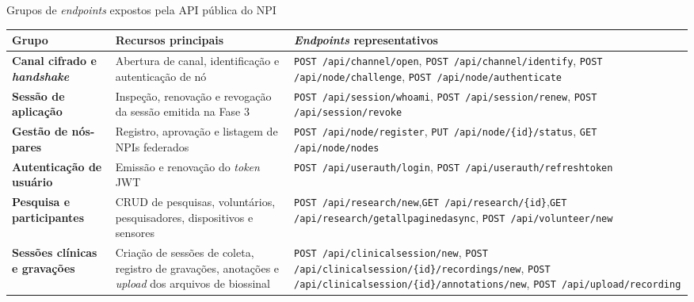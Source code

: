 \begin{tabframed}[htpb]
\caption{Grupos de \textit{endpoints} expostos pela API pública do NPI}
\label{quad:NPIEndpoints}
\begin{tabular}{|p{}|p{}|p{}|}
\hline
\textbf{Grupo} & \textbf{Recursos principais} & \textbf{\textit{Endpoints} representativos} \\ \hline
\textbf{Canal cifrado e \textit{handshake}} & Abertura de canal, identificação e autenticação de nó & \texttt{POST /api/channel/open}, \newline \texttt{POST /api/channel/identify}, \newline \texttt{POST /api/node/challenge}, \newline \texttt{POST /api/node/authenticate} \\ \hline
\textbf{Sessão de aplicação} & Inspeção, renovação e revogação da sessão emitida na Fase 3 & \texttt{POST /api/session/whoami}, \newline\texttt{POST /api/session/renew}, \newline\texttt{POST /api/session/revoke} \\ \hline
\textbf{Gestão de nós-pares} & Registro, aprovação e listagem de NPIs federados & \texttt{POST /api/node/register}, \newline \texttt{PUT /api/node/\{id\}/status}, \newline\texttt{GET /api/node/nodes} \\ \hline
\textbf{Autenticação de usuário} & Emissão e renovação do \textit{token} JWT & \texttt{POST /api/userauth/login}, \newline\texttt{POST /api/userauth/refreshtoken} \\ \hline
\textbf{Pesquisa e participantes} & CRUD de pesquisas, voluntários, pesquisadores, dispositivos e sensores & \texttt{POST /api/research/new},\newline\texttt{GET /api/research/\{id\}},\newline\texttt{GET /api/research/getallpaginedasync}, \texttt{POST /api/volunteer/new} \\ \hline
\textbf{Sessões clínicas e gravações} & Criação de sessões de coleta, registro de gravações, anotações e \textit{upload} dos arquivos de biossinal & \texttt{POST /api/clinicalsession/new}, \newline\texttt{POST /api/clinicalsession/\{id\}\newline/recordings/new}, \newline\texttt{POST /api/clinicalsession/\{id\}\newline/annotations/new}, \newline\texttt{POST /api/upload/recording} \\ \hline

\end{tabular}
\end{tabframed}
